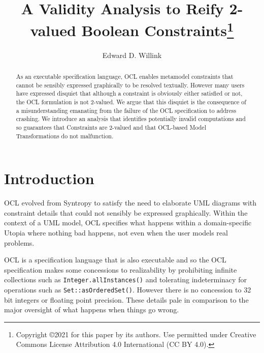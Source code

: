 \documentclass{llncs}
\begin{document}
%
\mainmatter              %
%
\title{A Validity Analysis to Reify 2-valued Boolean Constraints\thanks{%
      Copyright \copyright 2021 for this paper by its authors.
      Use permitted under Creative Commons License Attribution
      4.0 International (CC BY 4.0).}}
%
%
\author{Edward D. Willink}
%
%
%


\maketitle              %

\begin{abstract}
As an executable specification language, OCL enables metamodel constraints that cannot be sensibly expressed graphically to be resolved textually. However many users have expressed disquiet that although a constraint is obviously either satisfied or not, the OCL formulation is not 2-valued. We argue that this disquiet is the consequence of a misunderstanding emanating from the failure of the OCL specification to address crashing. We introduce an analysis that identifies potentially invalid computations and so guarantees that Constraints are 2-valued and that OCL-based Model Transformations do not malfunction.

\end{abstract}
%
\section{Introduction}
%
OCL \cite{OCL-2.4} evolved from Syntropy to satisfy the need to elaborate UML \cite{UML-2.5} diagrams with constraint details that could not sensibly be expressed graphically. Within the context of a UML model, OCL specifies what happens within a domain-specific Utopia where nothing bad happens, not even when the user models real problems.

OCL is a specification language that is also executable and so the OCL specification makes some concessions to realizability by prohibiting infinite collections such as \verb|Integer.allInstances()| and tolerating indeterminacy for operations such as \verb|Set::asOrderedSet()|. However there is no concession to 32 bit integers or floating point precision. These details pale in comparison to the major oversight of what happens when things go wrong.
\end{document}
